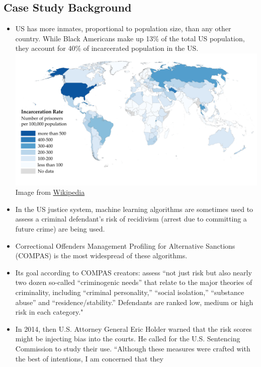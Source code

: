 \documentclass[
]{article}
\begin{document}
\hypertarget{case-study-background}{%
\subsection{Case Study Background}\label{case-study-background}}

\begin{itemize}
\item
  US has more inmates, proportional to population size, than any other
  country. While Black Americans make up 13\% of the total US
  population, they account for 40\% of incarcerated population in the
  US. \includegraphics{./Prisoners_world_map_png2.png} Image from
  \href{https://en.wikipedia.org/wiki/Incarceration_in_the_United_States\#/media/File:Prisoners_world_map_png2.png}{Wikipedia}
\item
  In the US justice system, machine learning algorithms are sometimes
  used to assess a criminal defendant's risk of recidivism (arrest due
  to committing a future crime) are being used.
\item
  Correctional Offenders Management Profiling for Alternative Sanctions
  (COMPAS) is the most widespread of these algorithms.
\item
  Its goal according to COMPAS creators: assess ``not just risk but also
  nearly two dozen so-called ``criminogenic needs'' that relate to the
  major theories of criminality, including ``criminal personality,''
  ``social isolation,'' ``substance abuse'' and ``residence/stability.''
  Defendants are ranked low, medium or high risk in each category."
\item
  In 2014, then U.S. Attorney General Eric Holder warned that the risk
  scores might be injecting bias into the courts. He called for the U.S.
  Sentencing Commission to study their use. ``Although these measures
  were crafted with the best of intentions, I am concerned that they

\end{itemize}
\end{document}
